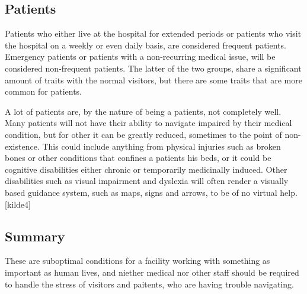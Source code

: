 


\subsection{Patients} %

Patients who either live at the hospital for extended periods or patients who visit the hospital on a weekly or even daily basis, are considered frequent patients. Emergency patients or patients with a non-recurring medical issue, will be considered non-frequent patients. The latter of the two groups, share a significant amount of traits with the normal visitors, but there are some traits that are more common for patients.

A lot of patients are, by the nature of being a patients, not completely well. Many patients will not have their ability to navigate impaired by their medical condition, but for other it can be greatly reduced, sometimes to the point of non-existence. This could include anything from physical injuries such as broken bones or other conditions that confines a patients his beds, or it could be cognitive disabilities either chronic or temporarily medicinally induced. Other disabilities such as visual impairment and dyslexia will often render a visually based guidance system, such as maps, signs and arrows, to be of no virtual help.[kilde4]


\subsection{Summary}

These are suboptimal conditions for a facility working with something as important as human lives, and niether medical nor other staff should be required to handle the stress of visitors and paitents, who are having trouble navigating.


